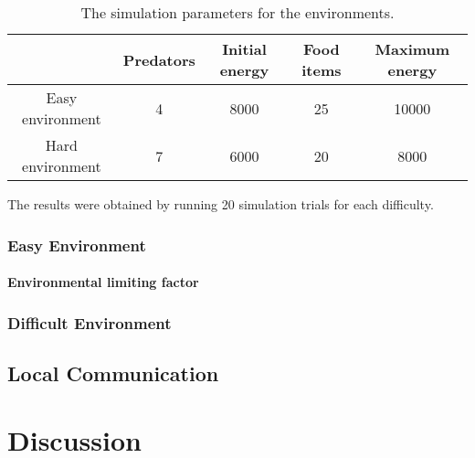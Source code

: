 \begin{table}[H]
	\centering
	\label{tab:environment-difficulty}
	\begin{tabular}{|c|c|c|c|c|}
		\hline  & Predators & Initial energy & Food items & Maximum energy \\ 
		\hline Easy environment & 4 & 8000 & 25 & 10000 \\ 
		\hline Hard environment & 7 & 6000 & 20 &8000 \\ 
		\hline 
		
	\end{tabular} 
	\caption{The simulation parameters for the environments.}
\end{table}

The results were obtained by running 20 simulation trials for each difficulty.
\subsubsection{Easy Environment}

\newpage
\pagestyle{plain}



\newpage

\paragraph{Environmental limiting factor}

\subsubsection{Difficult Environment}

\newpage



\newpage
\pagestyle{main}

\subsection{Local Communication}

\section{Discussion}

































